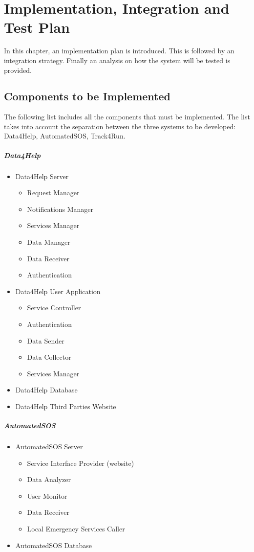 \documentclass[../DD.tex]{subfiles}
\begin{document}
\chapter{Implementation, Integration and Test Plan}
In this chapter, an implementation plan is introduced. This is followed by an integration strategy. Finally an analysis on how the system will be tested is provided.

\section{Components to be Implemented\label{sect:5.1}}
The following list includes all the components that must be implemented. The list takes into account the separation between the three systems to be developed: Data4Help, AutomatedSOS, Track4Run.
\paragraph{Data4Help}
\begin{itemize}
	\item{Data4Help Server}
	\begin{itemize}
		\item{Request Manager}
		\item{Notifications Manager}
		\item{Services Manager}
		\item{Data Manager}
		\item{Data Receiver}
		\item{Authentication}
	\end{itemize}
	\item{Data4Help User Application}
	\begin{itemize}
		\item{Service Controller}
		\item{Authentication}
		\item{Data Sender}
		\item{Data Collector}
		\item{Services Manager}
	\end{itemize}
	\item{Data4Help Database}
	\item{Data4Help Third Parties Website}
\end{itemize}
\paragraph{AutomatedSOS}
\begin{itemize}
	\item{AutomatedSOS Server}
	\begin{itemize}
		\item{Service Interface Provider (website)}
		\item{Data Analyzer}
		\item{User Monitor}
		\item{Data Receiver}
		\item{Local Emergency Services Caller}
	\end{itemize}
	\item{AutomatedSOS Database}
\end{itemize}
\end{document}
